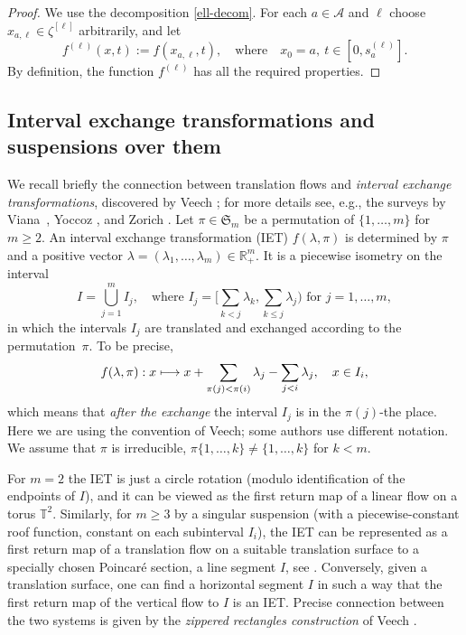 \documentclass[JEP,XML,SOM,Unicode]{cedram}
\let\mathcal\mathscr
\def\mto{\mathchoice{\longmapsto}{\mapsto}{\mapsto}{\mapsto}}
\newcommand{\sep}{:}
\theoremstyle{plain}
\theoremstyle{definition}
\let\lam\lambda
\newcommand\Frs{\mathfrak{S}}
\newcommand\Ak{\mathcal{A}}
\newcommand{\R}{\mathbb{R}}
\newcommand\T{\mathbb{T}}
\begin{document}
\begin{proof}
We use the decomposition \eqref{ell-decom}. For each $a\in \Ak$ and $\ell$ choose $x_{a,\ell}\in \zeta^{[\ell]}$ arbitrarily, and let
\[
f^{(\ell)}(x,t):= f(x_{a,\ell},t),\quad \text{where}\quad x_0=a,\ t\in [0, s_a^{(\ell)}].
\]
By definition, the function $f^{(\ell)}$ has all the required properties.
\end{proof}

\subsection{Interval exchange transformations and suspensions over them} \label{subsec-IET}

We recall briefly the connection between translation flows and \emph{interval exchange transformations}, discovered by Veech \cite{Veech0,
veech}; for more details see, e.g., the surveys by Viana~\cite{viana2}, Yoccoz \cite{yoccoz}, and Zorich \cite{Zorich1}. Let $\pi\in \Frs_m$ be a permutation of $\{1,\ldots,m\}$ for $m\ge 2$.
An interval exchange transformation (IET) $f(\lam,\pi)$ is determined by $\pi$ and a positive vector $\lam = (\lam_1,\ldots,\lam_m)\in \R^m_+$. It is a piecewise isometry on the interval
\[
I = \bigcup_{j=1}^m I_j,\quad \text{where }I_j = \textstyle\bigl[\sum_{k<j}\lam_k, \sum_{k\le j} \lam_j\bigr)\text{ for }j=1,\ldots,m,
\]
in which the intervals $I_j$ are translated and exchanged according to the permutation~$\pi$.
To be precise,
\[
f(\lam,\pi)\sep x\mto x + \sum_{\pi(j) < \pi(i)} \lam_j - \sum_{j < i} \lam_j,\quad x\in I_i,
\]
which means that \emph{after the exchange} the interval $I_j$ is in the $\pi(j)$-the place. Here we are using the convention of Veech; some authors use different notation.
We assume that $\pi$ is irreducible, \ie $\pi\{1,\ldots,k\}\ne \{1,\ldots,k\}$ for $k<m$.

For $m=2$ the IET is just a circle rotation (modulo identification of the endpoints of $I$), and it can be viewed as the first return map of a linear flow on a torus $\T^2$. Similarly, for $m\ge 3$ by a singular suspension (with a piecewise-constant roof function, constant on each subinterval $I_i$), the IET can be represented as a first return map of a translation flow on a suitable translation surface to a specially chosen Poincaré section, a line segment $I$, see \cite{Veech0,veech}. Conversely,
given a translation surface, one can find a horizontal segment $I$ in such a way that the first return map of the vertical flow to $I$ is an IET. Precise connection between the two systems is given by the \emph{zippered rectangles construction} of Veech \cite{veech}.
\end{document}
